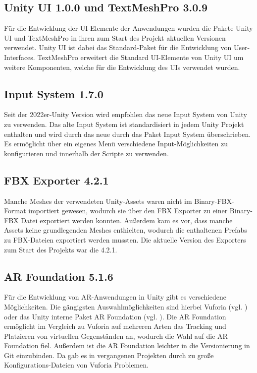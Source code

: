 \subsection{Unity UI 1.0.0 und TextMeshPro 3.0.9}
Für die Entwicklung der \ac{UI}-Elemente der Anwendungen wurden die Pakete Unity \ac{UI} und TextMeshPro in ihren zum Start des Projekt aktuellen Versionen verwendet. Unity \ac{UI} ist dabei das Standard-Paket für die Entwicklung von User-Interfaces. TextMeshPro erweitert die Standard \ac{UI}-Elemente von Unity \ac{UI} um weitere Komponenten, welche für die Entwicklung des \ac{UI}s verwendet wurden.

\subsection{Input System 1.7.0}
Seit der 2022er-Unity Version wird empfohlen das neue Input System von Unity zu verwenden. Das alte Input System ist standardisiert in jedem Unity Projekt enthalten und wird durch das neue durch das Paket Input System überschrieben. Es ermöglicht über ein eigenes Menü verschiedene Input-Möglichkeiten zu konfigurieren und innerhalb der Scripte zu verwenden.

\subsection{FBX Exporter 4.2.1}
Manche Meshes der verwendeten Unity-Assets waren nicht im Binary-\ac{FBX}-Format importiert gewesen, wodurch sie über den \ac{FBX} Exporter zu einer Binary-\ac{FBX} Datei exportiert werden konnten. Außerdem kam es vor, dass manche Assets keine grundlegenden Meshes enthielten, wodurch die enthaltenen Prefabs zu \ac{FBX}-Dateien exportiert werden mussten. Die aktuelle Version des Exporters zum Start des Projekts war die 4.2.1.

\subsection{AR Foundation 5.1.6}
Für die Entwicklung von \ac{AR}-Anwendungen in Unity gibt es verschiedene Möglichkeiten. Die gängigsten Auswahlmöglichkeiten sind hierbei Vuforia (vgl. \cite{noauthor_home_nodate}) oder das Unity interne Paket AR Foundation (vgl. \cite{noauthor_ar_nodate}). Die AR Foundation ermöglicht im Vergleich zu Vuforia auf mehreren Arten das Tracking und Platzieren von virtuellen Gegenständen an, wodurch die Wahl auf die AR Foundation fiel. Außerdem ist die AR Foundation leichter in die Versionierung in Git einzubinden. Da gab es in vergangenen Projekten durch zu große Konfigurations-Dateien von Vuforia Problemen.

